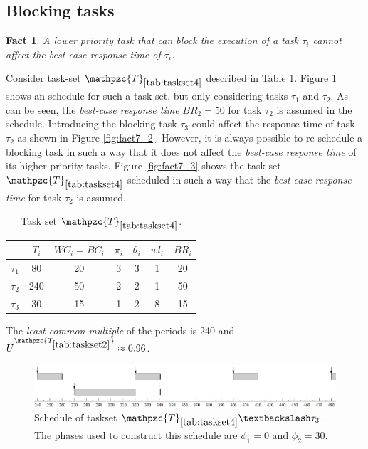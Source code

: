 \documentclass[fleqn]{article}
\newtheorem{fact}{Fact}
\begin{document}
\subsection{Blocking tasks}

\begin{fact}
	A lower priority task that can block the execution of a task $\tau_i$ cannot affect the \textit{best-case response time} of $\tau_i$.
\end{fact}

Consider task-set $\mathpzc{T}_{\ref{tab:taskset4}}$ described in Table \ref{tab:taskset4}. Figure \ref{fig:fact7_1} shows an schedule for such a task-set, but only considering tasks $\tau_1$ and $\tau_2$. As can be seen, the \textit{best-case response time} $BR_2=50$ for task $\tau_2$ is assumed in the schedule. Introducing the blocking task $\tau_3$ could affect the response time of task $\tau_2$ as shown in Figure \ref{fig:fact7_2}. However, it is always possible to re-schedule a blocking task in such a way that it does not affect the \textit{best-case response time} of its higher priority tasks. Figure \ref{fig:fact7_3} shows the task-set $\mathpzc{T}_{\ref{tab:taskset4}}$ scheduled in such a way that the \textit{best-case response time} for task $\tau_2$ is assumed.

\begin{table}[H]
	\center
	\caption{Task set $\mathpzc{T}_{\ref{tab:taskset4}}$.}
	\label{tab:taskset4}
	\begin{tabular}{c c c c c | c c}
		\hline 
		& $T_i$ & $WC_i=BC_i$ & $\pi_i$ & $\theta_i$ &  $wl_i$ & $BR_i$\\ 
		\hline 
		$\tau_1$& 80  & 20  & 3 & 3 &  1 & 20\\
		$\tau_2$& 240 & 50  & 2 & 2 &  1 & 50\\ 
		$\tau_3$& 30  & 15  & 1 & 2 &  8 & 15\\ 
		\hline 
	\end{tabular}
	\small
	\item The \textit{least common multiple} of the periods is 240 and $U^{\mathpzc{T_{\ref{tab:taskset2}}}} \approx 0.96$.
\end{table} 

\begin{figure}[H]
	\centering
	\includegraphics[width=0.9\linewidth]{figures/fact6_1}
	\caption{Schedule of taskset $\mathpzc{T}_{\ref{tab:taskset4}} \textbackslash \tau_3$. The phases used to construct this schedule are $\phi_1 = 0$ and $\phi_2 = 30$.}
	\label{fig:fact7_1}
\end{figure}
\end{document}
